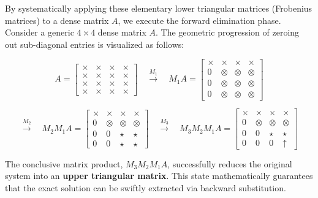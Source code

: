 \documentclass[12pt, a4paper]{article}
\theoremstyle{break}
\begin{document}
By systematically applying these elementary lower triangular matrices (Frobenius matrices) to a dense matrix $A$, we execute the forward elimination phase.
Consider a generic $4 \times 4$ dense matrix $A$. The geometric progression of zeroing out sub-diagonal entries is visualized as follows:

\[
A = \begin{bmatrix}
\times & \times & \times & \times \\
\times & \times & \times & \times \\
\times & \times & \times & \times \\
\times & \times & \times & \times
\end{bmatrix}
\quad \xrightarrow{M_1} \quad
M_1 A = \begin{bmatrix}
\times & \times & \times & \times \\
0 & \otimes & \otimes & \otimes \\
0 & \otimes & \otimes & \otimes \\
0 & \otimes & \otimes & \otimes
\end{bmatrix}
\]

\[
\xrightarrow{M_2} \quad
M_2 M_1 A = \begin{bmatrix}
\times & \times & \times & \times \\
0 & \otimes & \otimes & \otimes 
\\
0 & 0 & \star & \star \\
0 & 0 & \star & \star
\end{bmatrix}
\quad \xrightarrow{M_3} \quad
M_3 M_2 M_1 A = \begin{bmatrix}
\times & \times & \times & \times \\
0 & \otimes & \otimes & \otimes \\
0 & 0 & \star & \star \\
0 & 0 & 0 & \uparrow
\end{bmatrix}
\]

The conclusive matrix product, $M_3 M_2 M_1 A$, successfully reduces the original system into an \textbf{upper triangular matrix}.
This state mathematically guarantees that the exact solution can be swiftly extracted via backward substitution.
\end{document}
